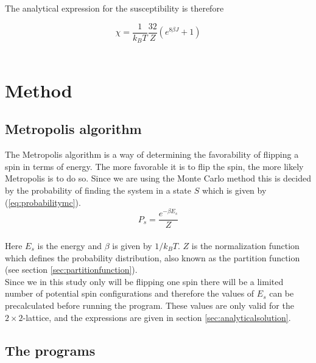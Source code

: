 \documentclass{article}
\begin{document}
The analytical expression for the susceptibility is therefore

\begin{equation}    \label{eq:finalsusceptibility}
    \chi = \frac{1}{k_B T} \frac{32}{Z} \left( e^{8 \beta J} + 1 \right)
\end{equation} \\
\fi



\vspace{1cm}

\section{Method} \label{sec:Method}

\iffalse
\subsection{Metropolis algorithm} \label{sec:metropolis}

The Metropolis algorithm is a way of determining the favorability of flipping a spin in terms of energy. The more favorable it is to flip the spin, the more likely Metropolis is to do so. Since we are using the Monte Carlo method this is decided by the probability of finding the system in a state $S$ which is given by (\ref{eq:probabilitymc}). \\

\begin{equation} \label{eq:probabilitymc}
    P_s = \frac{e^{-\beta E_s}}{Z}
\end{equation} \\

Here $E_s$ is the energy and $\beta$ is given by $1/k_B T$. $Z$ is the normalization function which defines the probability distribution, also known as the partition function (see section \ref{sec:partitionfunction}). \\

Since we in this study only will be flipping one spin there will be a limited number of potential spin configurations and therefore the values of $E_s$ can be precalculated before running the program. These values are only valid for the $2 \times 2$-lattice, and the expressions are given in section \ref{sec:analyticalsolution}.   \\


\subsection{The programs} \label{sec:programs}
\end{document}
